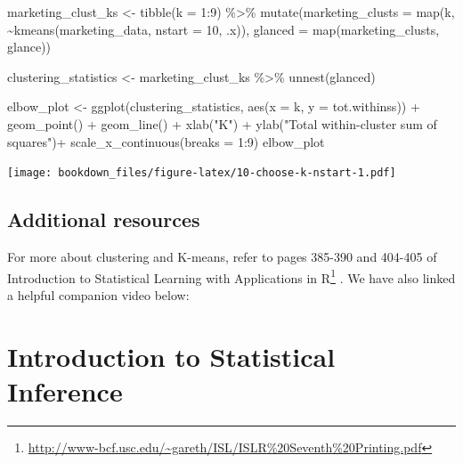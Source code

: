 \documentclass[
]{krantz}
\makeatletter
\newenvironment{Shaded}{\begin{snugshade}}{\end{snugshade}}
\newcommand{\AttributeTok}[1]{\textcolor[rgb]{0.61,0.61,0.61}{#1}}
\newcommand{\DecValTok}[1]{\textcolor[rgb]{0.06,0.06,0.06}{#1}}
\newcommand{\FunctionTok}[1]{\textcolor[rgb]{0,0,0}{#1}}
\newcommand{\NormalTok}[1]{#1}
\newcommand{\OtherTok}[1]{\textcolor[rgb]{0.37,0.37,0.37}{#1}}
\newcommand{\SpecialCharTok}[1]{\textcolor[rgb]{0,0,0}{#1}}
\newcommand{\StringTok}[1]{\textcolor[rgb]{0.5,0.5,0.5}{#1}}
\renewcommand{\href}[2]{#2\footnote{\url{#1}}}
\newenvironment{kframe}{%
\medskip{}
\setlength{\fboxsep}{.8em}
 \def\at@end@of@kframe{}%
 \ifinner\ifhmode%
  \def\at@end@of@kframe{\end{minipage}}%
  \begin{minipage}{\columnwidth}%
 \fi\fi%
 \def\FrameCommand##1{\hskip\@totalleftmargin \hskip-\fboxsep
 \colorbox{shadecolor}{##1}\hskip-\fboxsep
     \hskip-\linewidth \hskip-\@totalleftmargin \hskip\columnwidth}%
 \MakeFramed {\advance\hsize-\width
   \@totalleftmargin\z@ \linewidth\hsize
   \@setminipage}}%
 {\par\unskip\endMakeFramed%
 \at@end@of@kframe}
\renewenvironment{Shaded}{\begin{kframe}}{\end{kframe}}
\makeatother
\begin{document}
\begin{Shaded}
\begin{Highlighting}[]
\NormalTok{marketing\_clust\_ks }\OtherTok{\textless{}{-}} \FunctionTok{tibble}\NormalTok{(}\AttributeTok{k =} \DecValTok{1}\SpecialCharTok{:}\DecValTok{9}\NormalTok{) }\SpecialCharTok{\%\textgreater{}\%}
  \FunctionTok{mutate}\NormalTok{(}\AttributeTok{marketing\_clusts =} \FunctionTok{map}\NormalTok{(k, }\SpecialCharTok{\textasciitilde{}}\FunctionTok{kmeans}\NormalTok{(marketing\_data, }\AttributeTok{nstart =} \DecValTok{10}\NormalTok{, .x)),}
         \AttributeTok{glanced =} \FunctionTok{map}\NormalTok{(marketing\_clusts, glance)) }

\NormalTok{clustering\_statistics }\OtherTok{\textless{}{-}}\NormalTok{ marketing\_clust\_ks }\SpecialCharTok{\%\textgreater{}\%}
  \FunctionTok{unnest}\NormalTok{(glanced)}

\NormalTok{elbow\_plot }\OtherTok{\textless{}{-}} \FunctionTok{ggplot}\NormalTok{(clustering\_statistics, }\FunctionTok{aes}\NormalTok{(}\AttributeTok{x =}\NormalTok{ k, }\AttributeTok{y =}\NormalTok{ tot.withinss)) }\SpecialCharTok{+}
  \FunctionTok{geom\_point}\NormalTok{() }\SpecialCharTok{+}
  \FunctionTok{geom\_line}\NormalTok{() }\SpecialCharTok{+}
  \FunctionTok{xlab}\NormalTok{(}\StringTok{"K"}\NormalTok{) }\SpecialCharTok{+}
  \FunctionTok{ylab}\NormalTok{(}\StringTok{"Total within{-}cluster sum of squares"}\NormalTok{)}\SpecialCharTok{+}
  \FunctionTok{scale\_x\_continuous}\NormalTok{(}\AttributeTok{breaks =} \DecValTok{1}\SpecialCharTok{:}\DecValTok{9}\NormalTok{)}
\NormalTok{elbow\_plot}
\end{Highlighting}
\end{Shaded}

\texttt{[image: bookdown\_files/figure-latex/10-choose-k-nstart-1.pdf]}

\hypertarget{additional-resources-4}{%
\section{Additional resources}\label{additional-resources-4}}

For more about clustering and K-means, refer to pages 385-390 and 404-405
of \href{http://www-bcf.usc.edu/~gareth/ISL/ISLR\%20Seventh\%20Printing.pdf}{Introduction to Statistical Learning with Applications in R} \citeyearpar{james2013introduction}. We have also linked a helpful companion video below:

\hypertarget{inference}{%
\chapter{Introduction to Statistical Inference}\label{inference}}
\end{document}
